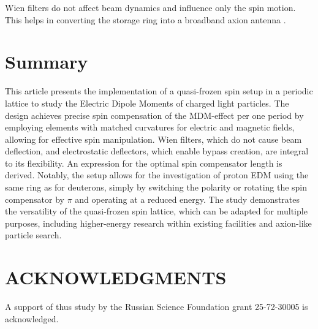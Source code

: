 \documentclass[submitting]{nst}
\begin{document}
\par Wien filters do not affect beam dynamics and influence only the spin motion. This helps in converting the storage ring into a broadband axion antenna \cite{axion, axion_nica}.

\section{Summary} \label{sec.V}

\par This article presents the implementation of a quasi-frozen spin setup in a periodic lattice to study the Electric Dipole Moments of charged light particles. The design achieves precise spin compensation of the MDM-effect per one period by employing elements with matched curvatures for electric and magnetic fields, allowing for effective spin manipulation. Wien filters, which do not cause beam deflection, and electrostatic deflectors, which enable bypass creation, are integral to its flexibility. An expression for the  optimal spin compensator length is derived. Notably, the setup allows for the investigation of proton EDM using the same ring as for deuterons, simply by switching the polarity or rotating the spin compensator by $\pi$ and operating at a reduced energy. The study demonstrates the versatility of the quasi-frozen spin lattice, which can be adapted for multiple purposes, including higher-energy research within existing facilities and axion-like particle search.

\section*{ACKNOWLEDGMENTS}

\par A support of thus study by the Russian Science Foundation grant 25-72-30005 is acknowledged.
\end{document}
